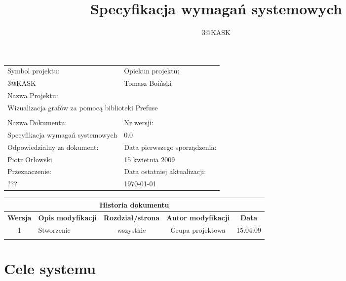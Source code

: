 \documentclass[a4paper,10pt]{article}
\title{Specyfikacja wymagań systemowych}
\author{3@KASK}
\begin{document}



\maketitle


\begin{center}
\begin{tabular}{|p{7cm}|p{7cm}|}
\hline
Symbol projektu: & Opiekun projektu:   \tabularnewline 
3@KASK & Tomasz Boiński    \tabularnewline \hline
\multicolumn{2}{|l|}{Nazwa Projektu: } \tabularnewline
\multicolumn{2}{|l|}{Wizualizacja grafów za pomocą biblioteki Prefuse } \tabularnewline 
\hline
\multicolumn{2}{l}{ } \tabularnewline %
\hline 
Nazwa Dokumentu: & Nr wersji:   \tabularnewline 
Specyfikacja wymagań systemowych & 0.0 \tabularnewline \hline
Odpowiedzialny za dokument: & Data pierwszego sporządzenia:   \tabularnewline 
Piotr Orłowski & 15 kwietnia 2009 \tabularnewline \hline
Przeznaczenie: & Data ostatniej aktualizacji:   \tabularnewline 
??? & \today \tabularnewline \hline
\end{tabular}
\end{center}


\begin{center}
\begin{tabular}{|c|p{4cm}|c|c|c|}
\multicolumn{5}{c}{\textbf{Historia dokumentu}} \tabularnewline \hline
\textbf{Wersja} & \textbf{Opis modyfikacji} & \textbf{Rozdział/strona} & \textbf{Autor modyfikacji} & \textbf{Data} \tabularnewline \hline 
1 & Stworzenie & wszystkie & Grupa projektowa & 15.04.09 \tabularnewline \hline
& & & &\tabularnewline \hline
\end{tabular}
 

\end{center}


\newpage
\tableofcontents
\newpage

\section{Cele systemu}

\end{document}
